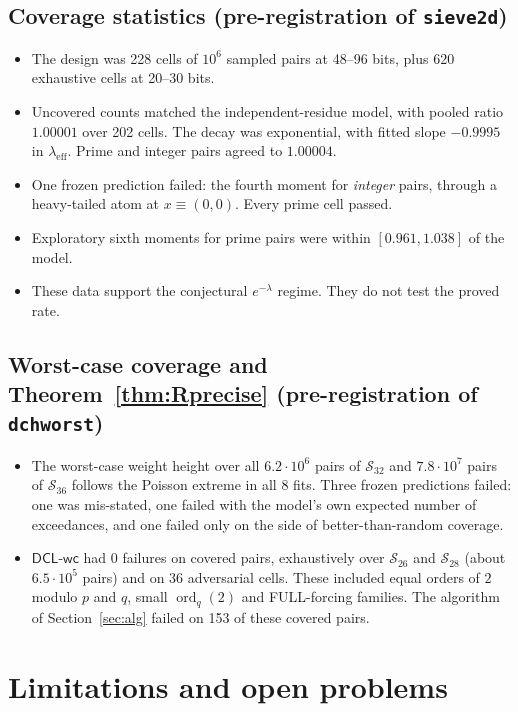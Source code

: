 \documentclass[11pt]{amsart}
\theoremstyle{definition}
\newcommand{\ord}{\operatorname{ord}}
\newcommand{\DCLwc}{\textsf{DCL-wc}}
\begin{document}
\subsection{Coverage statistics (pre-registration of \texttt{sieve2d})}
\begin{itemize}
\item The design was 228 cells of $10^6$ sampled pairs at 48--96 bits, plus 620 exhaustive cells
  at 20--30 bits.
\item Uncovered counts matched the independent-residue model, with pooled ratio $1.00001$ over
  202 cells. The decay was exponential, with fitted slope $-0.9995$ in $\lambda_{\mathrm{eff}}$.
  Prime and integer pairs agreed to $1.00004$.
\item One frozen prediction failed: the fourth moment for \emph{integer} pairs, through a
  heavy-tailed atom at $x\equiv(0,0)$. Every prime cell passed.
\item Exploratory sixth moments for prime pairs were within $[0.961,1.038]$ of the model.
\item These data support the conjectural $e^{-\lambda}$ regime. They do not test the proved rate.
\end{itemize}

\subsection{Worst-case coverage and Theorem~\ref{thm:Rprecise} (pre-registration of \texttt{dchworst})}
\begin{itemize}
\item The worst-case weight height over all $6.2\cdot10^6$ pairs of $\mathcal S_{32}$ and
  $7.8\cdot10^7$ pairs of $\mathcal S_{36}$ follows the Poisson extreme in all 8 fits. Three
  frozen predictions failed: one was mis-stated, one failed with the model's own expected number of
  exceedances, and one failed only on the side of better-than-random coverage.
\item $\DCLwc$ had 0 failures on covered pairs, exhaustively over $\mathcal S_{26}$ and
  $\mathcal S_{28}$ (about $6.5\cdot10^5$ pairs) and on 36 adversarial cells. These included
  equal orders of $2$ modulo $p$ and $q$, small $\ord_q(2)$ and FULL-forcing families. The
  algorithm of Section~\ref{sec:alg} failed on 153 of these covered pairs.
\end{itemize}

\section{Limitations and open problems}\label{sec:open}
\end{document}
